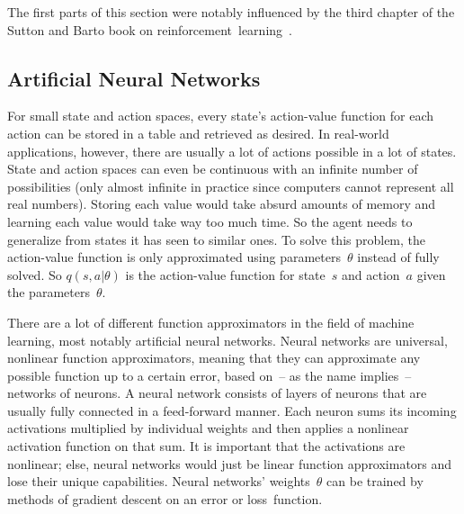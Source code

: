 \documentclass[a4paper,titlepage]{article}
\begin{document}
The first parts of this section were notably influenced by the third chapter of the Sutton and Barto book on reinforcement~learning~\cite{book}.

\subsection{Artificial Neural Networks}
\label{sec:anns}

For small state and action spaces, every state's action-value function for each action can be stored in a table and retrieved as desired. In real-world applications, however, there are usually a lot of actions possible in a lot of states. State and action spaces can even be continuous with an infinite number of possibilities (only almost infinite in practice since computers cannot represent all real numbers). Storing each value would take absurd amounts of memory and learning each value would take way too much time. So the agent needs to generalize from states it has seen to similar ones. To solve this problem, the action-value function is only approximated using parameters~$\theta$ instead of fully solved. So $q(s, a | \theta)$ is the action-value function for state~$s$ and action~$a$ given the parameters~$\theta$.

There are a lot of different function approximators in the field of machine learning, most notably artificial neural networks. Neural networks are universal, nonlinear   function approximators, meaning that they can approximate any possible function up to a certain error, based on~-- as the name implies~-- networks of neurons. A neural network consists of layers of neurons that are usually fully connected in a feed-forward manner. Each neuron sums its incoming activations multiplied by individual weights and then applies a nonlinear activation function on that sum. %
It is important that the activations are nonlinear; else, neural networks would just be linear function approximators and lose their unique capabilities.
Neural networks' weights~$\theta$ can be trained by methods of gradient descent on an error or loss~function.
\end{document}
